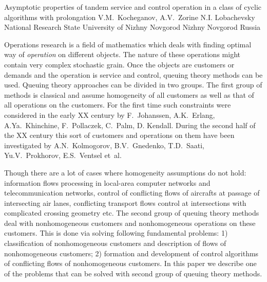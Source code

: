 %
%
%

\Title
{%
Asymptotic properties of tandem service and control operation in a class of cyclic algorithms with prolongation
}
{%
V.M.~Kocheganov, A.V.~Zorine%
}
{%
N.I. Lobachevsky National Research State University of Nizhny Novgorod%
}
{%
Nizhny Novgorod
}
{%
Russia
}

%
%


Operations research is a field of mathematics which deals with finding optimal way of \textit{operation} on different objects. The nature of these operations might contain very complex stochastic grain.  Once the objects are customers or demands and the operation is service and control, queuing theory methods can be used. Queuing theory approaches can be divided in two groups. The first group of methods is classical and assume homogeneity of all customers as well as that of all operations on the customers. For the first time such constraints were considered in the early XX century by F.~Johanssen, A.K.~Erlang, A.Ya.~Khinchine, F.~Pollaczek, C.~Palm,
D. Kendall. During the second half of the XX century this sort of customers and operations on them have been investigated by A.N.~Kolmogorov, B.V.~Gnedenko, T.D.~Saati, Yu.V.~Prokhorov, E.S.~Ventsel et~al. 

Though there are a lot of cases where homogeneity assumptions do not hold: information flows processing in local-area computer networks and telecommunication networks, control of conflicting flows of aircrafts at passage of intersecting air lanes, conflicting transport flows control at intersections with complicated crossing geometry etc.
The second group of queuing theory methods deal with nonhomogeneous customers and nonhomogeneous operations on these customers. This is done via solving following fundamental problems: 1) classification of nonhomogeneous customers
and description of flows of nonhomogeneous customers; 2) formation and development of control algorithms of conflicting flows of nonhomogeneous customers. In this paper we describe one of the problems that can be solved with second group of queuing theory methods.


